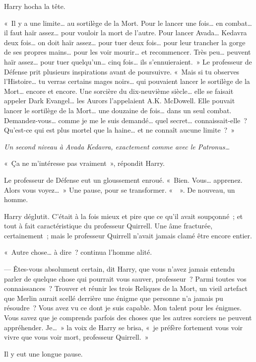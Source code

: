 Harry hocha la tête.

«~Il y a une limite… au sortilège de la Mort. Pour le lancer une fois… en combat… il faut haïr assez… pour vouloir la mort de l'autre. Pour lancer Avada… Kedavra deux fois… on doit haïr assez… pour tuer deux fois… pour leur trancher la gorge de ses propres mains… pour les voir mourir… et recommencer. Très peu… peuvent haïr assez… pour tuer quelqu'un… cinq fois… ils s'ennuieraient.~» Le professeur de Défense prit plusieurs inspirations avant de poursuivre. «~Mais si tu observes l'Histoire… tu verras certains mages noirs… qui pouvaient lancer le sortilège de la Mort… encore et encore. Une sorcière du dix-neuvième siècle… elle se faisait appeler Dark Evangel… les Aurors l'appelaient A.K. McDowell. Elle pouvait lancer le sortilège de la Mort… une douzaine de fois… dans un seul combat. Demandez-vous… comme je me le suis demandé… quel secret… connaissait-elle~? Qu'est-ce qui est plus mortel que la haine… et ne connaît aucune limite~?~»

\emph{Un second niveau à Avada Kedavra, exactement comme avec le Patronus…}

«~Ça ne m'intéresse pas vraiment~», répondit Harry.

Le professeur de Défense eut un gloussement enroué. «~Bien. Vous… apprenez. Alors vous voyez…~» Une pause, pour se transformer. «~~». De nouveau, un homme.

Harry déglutit. C'était à la fois mieux et pire que ce qu'il avait soupçonné~; et tout à fait caractéristique du professeur Quirrell. Une âme fracturée, certainement~; mais le professeur Quirrell n'avait jamais clamé être encore entier.

«~Autre chose… à dire~? continua l'homme alité.

--- Êtes-vous absolument certain, dit Harry, que vous n'avez jamais entendu parler de quelque chose qui pourrait vous sauver, professeur~? Parmi toutes vos connaissances~? Trouver et réunir les trois Reliques de la Mort, un vieil artefact que Merlin aurait scellé derrière une énigme que personne n'a jamais pu résoudre~? Vous avez vu ce dont je suis capable. Mon talent pour les énigmes. Vous savez que je comprends parfois des choses que les autres sorciers ne peuvent appréhender. Je…~» la voix de Harry se brisa, «~je préfère fortement vous voir vivre que vous voir mort, professeur Quirrell.~»

Il y eut une longue pause.

